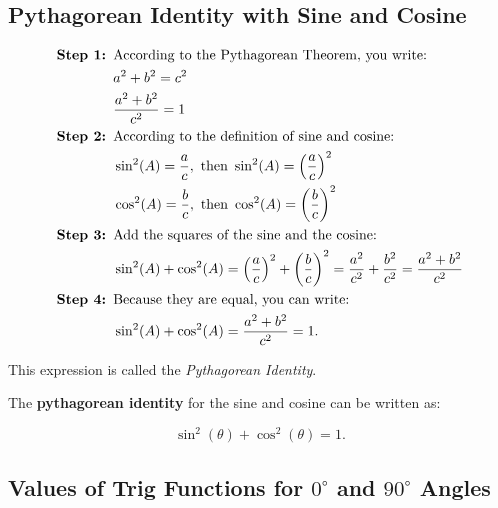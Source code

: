 
\subsection{Pythagorean Identity with Sine and Cosine}
\label{sub_sec:pythagorean_identity_with_sine_and_cosine}

\begin{align*}
  \textrm{\textbf{Step 1: }}&\textrm{According to the Pythagorean Theorem, you write:} \\
   &a^{2} + b^{2} = c^{2} \\
   &\frac{a^{2} + b^{2}}{c^{2}} = 1 \\
  \textrm{\textbf{Step 2: }}&\textrm{According to the definition of sine and cosine:} \\
   &\sin^{2}(A) = \frac{a}{c}, \textrm{ then } \sin^{2}(A) = \left(\frac{a}{c}\right)^{2} \\
   &\cos^{2}(A) = \frac{b}{c}, \textrm{ then } \cos^{2}(A) = \left(\frac{b}{c}\right)^{2} \\
  \textrm{\textbf{Step 3: }}&\textrm{Add the squares of the sine and the cosine:} \\
   &\sin^{2}(A) + \cos^{2}(A) = \left(\frac{a}{c}\right)^{2} + \left(\frac{b}{c}\right)^{2} = \frac{a^{2}}{c^{2}} + \frac{b^{2}}{c^{2}} = \frac{a^{2} + b^{2}}{c^{2}} \\
  \textrm{\textbf{Step 4: }}&\textrm{Because they are equal, you can write:} \\
   &\sin^{2}(A) + \cos^{2}(A) = \frac{a^{2} + b^{2}}{c^{2}} = 1
.\end{align*}

This expression is called the \textit{Pythagorean Identity}.

\begin{definition}
  \label{def:pythagorean_identity}

  The \textbf{pythagorean identity} for the sine and cosine can be written as:

  \[ \sin^{2}(\theta) + \cos^{2}(\theta) = 1 . \]
\end{definition}


\subsection{Values of Trig Functions for $0^{\circ}$ and $90^{\circ}$ Angles}
\label{sub_sec:values_of_trig_functions_for_0_circ_and_90_circ_angles}

